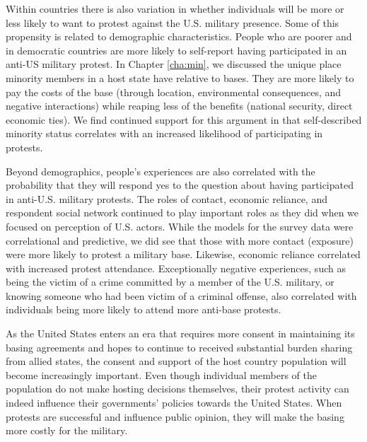 
Within countries there is also variation in whether individuals will be more or less likely to want to protest against the U.S. military presence. Some of this propensity is related to demographic characteristics. People who are poorer and in democratic countries are more likely to self-report having participated in an anti-US military protest. In Chapter \ref{cha:min}, we discussed the unique place minority members in a host state have relative to bases. They are more likely to pay the costs of the base (through location, environmental consequences, and negative interactions) while reaping less of the benefits (national security, direct economic ties). We find continued support for this argument in that self-described minority status correlates with an increased likelihood of participating in protests.


Beyond demographics, people's experiences are also correlated with the probability that they will respond yes to the question about having participated in anti-U.S. military protests. The roles of contact, economic reliance, and respondent social network continued to play important roles as they did when we focused on perception of U.S. actors. While the models for the survey data were correlational and predictive, we did see that those with more contact (exposure) were more likely to protest a military base. Likewise, economic reliance correlated with increased protest attendance. Exceptionally negative experiences, such as being the victim of a crime committed by a member of the U.S. military, or knowing someone who had been victim of a criminal offense, also correlated with individuals being more likely to attend more anti-base protests. 

As the United States enters an era that requires more consent in maintaining its basing agreements and hopes to continue to received substantial burden sharing from allied states, the consent and support of the host country population will become increasingly important. Even though individual members of the population do not make hosting decisions themselves, their protest activity can indeed influence their governments' policies towards the United States. When protests are successful and influence public opinion, they will make the basing more costly for the military.




